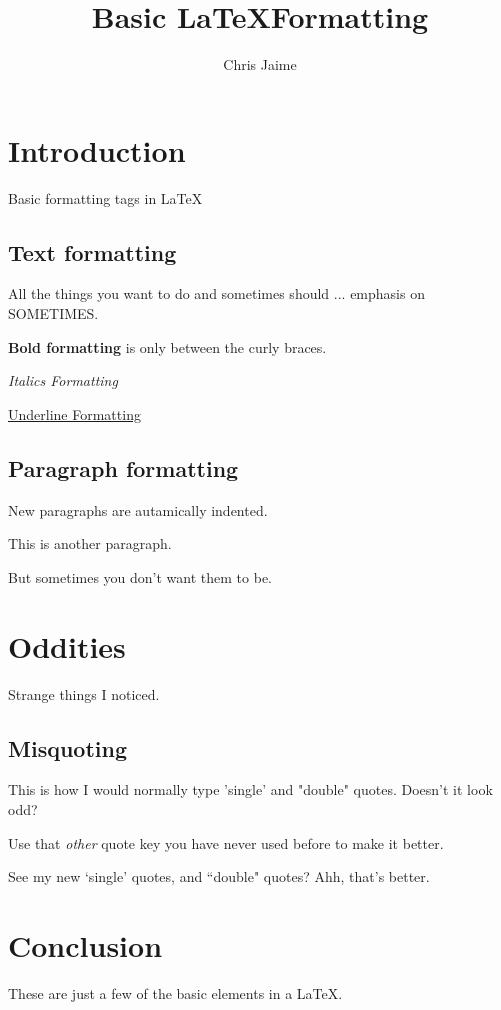 \documentclass{article}
\title{Basic \LaTeX Formatting}
\author{Chris Jaime}
\date{}
\begin{document}
\maketitle

\section{Introduction}
Basic formatting tags in \LaTeX

\subsection{Text formatting}
All the things you want to do and sometimes should ... emphasis on SOMETIMES.


\textbf{Bold formatting} is only between the curly braces.

\emph{Italics Formatting}

\underline{Underline Formatting}

\subsection{Paragraph formatting}
New paragraphs are autamically indented.

This is another paragraph.

\noindent But sometimes you don't want them to be.

\section{Oddities}
Strange things I noticed.

\subsection{Misquoting}
This is how I would normally type 'single' and "double" quotes. Doesn't it look odd?

\noindent Use that \emph{other} quote key you have never used before to make it better.

\noindent See my new `single' quotes, and ``double" quotes? Ahh, that's better.


\section{Conclusion}
These are just a few of the basic elements in a \LaTeX. 
\end{document}
